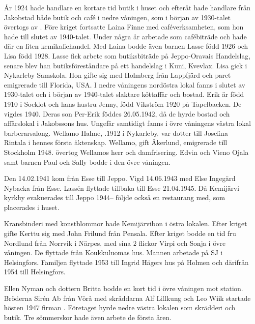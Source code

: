 År 1924 hade handlare  en kortare tid butik i huset och efteråt hade handlare  från Jakobstad både butik och café i nedre våningen, som i början av 1930-talet övertogs av . Före kriget fortsatte {Laina Finne} med caféverksamheten, som hon hade till slutet av 1940-talet. Under några år arbetade  som cafébiträde och hade där en liten kemikaliehandel. Med Laina bodde även barnen Lasse född 1926 och Lisa född 1928. Lasse fick arbete som butiksbiträde på Jeppo-Oravais Handelslag, senare blev han butiksföreståndare på ett handelslag i Kuni, Kvevlax.  Lisa gick i Nykarleby Samskola. Hon gifte sig med Holmberg från Lappfjärd och paret emigrerade till Florida, USA.
I nedre våningens nordöstra lokal fanns i slutet av 1930-talet och i början av 1940-talet slaktare  köttaffär och bostad. Erik är född 1910 i Socklot och hans hustru Jenny, född Vikström 1920 på Tapelbacken. De vigdes 1940. Deras son Per-Erik föddes 26.05.1942, då de hyrde bostad och affärslokal i Jakobssons hus. Ungefär samtidigt fanns i övre våningens västra lokal  barberarsalong. Wellamo Halme, .1912 i Nykarleby, var dotter till Josefina Rintala i hennes första äktenskap. Wellamo, gift Åkerlund, emigrerade till Stockholm 1948.  övertog Wellamos herr och damfrisering. Edvin och Vieno Ojala samt barnen Paul och Sally bodde i den övre våningen.

Den 14.02.1941 kom  från Esse till Jeppo. Vigd 14.06.1943 med Else Ingegärd Nybacka från Esse. Lassén flyttade tillbaka till Esse 21.04.1945. Då Kemijärvi kyrkby evakuerades till Jeppo 1944-- följde också en restaurang  med, som placerades i huset.

Kransbinderi med konstblommor hade Kemijärvibon  i östra lokalen. Efter kriget gifte Kerttu sig med John Frilund från Pensala. Efter kriget bodde en tid fru Nordlund från Norrvik i Närpes, med sina 2 flickor Virpi och Sonja i övre våningen. De flyttade från Koukkuluomas hus. Mannen arbetade på SJ i Helsingfors. Familjen flyttade 1953 till Ingrid Hägers hus på Holmen och därifrån 1954 till Helsingfors.

Ellen Nyman och dottern Britta bodde en kort tid i övre våningen mot station. Bröderna Sirén Ab från Vörå med skräddarna Alf Lillkung och Leo Wiik startade hösten 1947 firman . Företaget hyrde nedre västra lokalen som skrädderi och butik. Tre sömmerskor hade även arbete de första åren.

